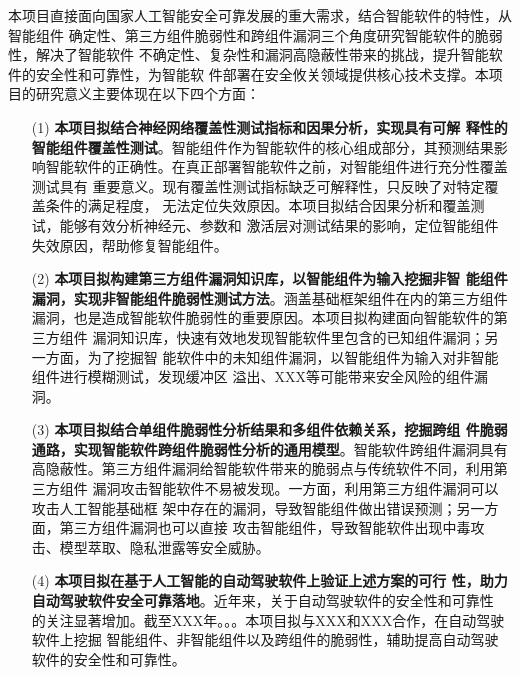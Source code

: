 本项目直接面向国家人工智能安全可靠发展的重大需求，结合智能软件的特性，从智能组件
确定性、第三方组件脆弱性和跨组件漏洞三个角度研究智能软件的脆弱性，解决了智能软件
不确定性、复杂性和漏洞高隐蔽性带来的挑战，提升智能软件的安全性和可靠性，为智能软
件部署在安全攸关领域提供核心技术支撑。本项目的研究意义主要体现在以下四个方面：

\begin{itemize}
    \item[(1)]\textbf{本项目拟结合神经网络覆盖性测试指标和因果分析，实现具有可解
    释性的智能组件覆盖性测试}。智能组件作为智能软件的核心组成部分，其预测结果影
    响智能软件的正确性。在真正部署智能软件之前，对智能组件进行充分性覆盖测试具有
    重要意义。现有覆盖性测试指标缺乏可解释性，只反映了对特定覆盖条件的满足程度，
    无法定位失效原因。本项目拟结合因果分析和覆盖测试，能够有效分析神经元、参数和
    激活层对测试结果的影响，定位智能组件失效原因，帮助修复智能组件。
    \item[(2)]\textbf{本项目拟构建第三方组件漏洞知识库，以智能组件为输入挖掘非智
    能组件漏洞，实现非智能组件脆弱性测试方法}。涵盖基础框架组件在内的第三方组件
    漏洞，也是造成智能软件脆弱性的重要原因。本项目拟构建面向智能软件的第三方组件
    漏洞知识库，快速有效地发现智能软件里包含的已知组件漏洞；另一方面，为了挖掘智
    能软件中的未知组件漏洞，以智能组件为输入对非智能组件进行模糊测试，发现缓冲区
    溢出、XXX等可能带来安全风险的组件漏洞。
    \item[(3)]\textbf{本项目拟结合单组件脆弱性分析结果和多组件依赖关系，挖掘跨组
    件脆弱通路，实现智能软件跨组件脆弱性分析的通用模型}。智能软件跨组件漏洞具有
    高隐蔽性。第三方组件漏洞给智能软件带来的脆弱点与传统软件不同，利用第三方组件
    漏洞攻击智能软件不易被发现。一方面，利用第三方组件漏洞可以攻击人工智能基础框
    架中存在的漏洞，导致智能组件做出错误预测；另一方面，第三方组件漏洞也可以直接
    攻击智能组件，导致智能软件出现中毒攻击、模型萃取、隐私泄露等安全威胁。
    \item[(4)]\textbf{本项目拟在基于人工智能的自动驾驶软件上验证上述方案的可行
    性，助力自动驾驶软件安全可靠落地}。近年来，关于自动驾驶软件的安全性和可靠性
    的关注显著增加。截至XXX年。。。本项目拟与XXX和XXX合作，在自动驾驶软件上挖掘
    智能组件、非智能组件以及跨组件的脆弱性，辅助提高自动驾驶软件的安全性和可靠性。
\end{itemize}



